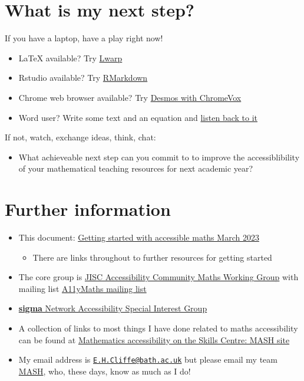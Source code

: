 \documentclass[
  17pt,
  a4paper]{extarticle}
\providecommand{\tightlist}{%
  \setlength{\itemsep}{0pt}\setlength{\parskip}{0pt}}
\theoremstyle{plain}
\theoremstyle{plain}
\theoremstyle{plain}
\theoremstyle{plain}
\theoremstyle{plain}
\theoremstyle{definition}
\theoremstyle{definition}
\theoremstyle{definition}
\theoremstyle{remark}
\renewcommand{\;}{\,}
\begin{document}
\hypertarget{what-is-my-next-step}{%
\section{What is my next step?}\label{what-is-my-next-step}}

If you have a laptop, have a play right now!

\begin{itemize}
\tightlist
\item
  LaTeX available? Try \href{LINK}{Lwarp}
\item
  Rstudio available? Try \href{https://stem-enable.github.io/RMarkdownWorkshop/}{RMarkdown}
\item
  Chrome web browser available? Try \href{https://people.bath.ac.uk/cspehj/coventry/arclengthInR.html}{Desmos with ChromeVox}
\item
  Word user? Write some text and an equation and \href{https://stem-enable.github.io/WordWorkshop/immersive.html}{listen back to it}
\end{itemize}

If not, watch, exchange ideas, think, chat:

\begin{itemize}
\tightlist
\item
  What achieveable next step can you commit to to improve the accessiblibility of your mathematical teaching resources for next academic year?
\end{itemize}

\hypertarget{further-information}{%
\section{Further information}\label{further-information}}

\begin{itemize}
\tightlist
\item
  This document: \href{}{Getting started with accessible maths March 2023}

  \begin{itemize}
  \tightlist
  \item
    There are links throughout to further resources for getting started
  \end{itemize}
\item
  The core group is \href{https://github.com/A11yMaths}{JISC Accessibility Community Maths Working Group} with mailing list \href{https://www.jiscmail.ac.uk/cgi-bin/webadmin?A0=ACCESSIBLE-MATHS}{A11yMaths mailing list}
\item
  \href{http://www.sigma-network.ac.uk/sigs/accessibility-sig/}{\textbf{sigma} Network Accessibility Special Interest Group}
\item
  A collection of links to most things I have done related to maths accessibility can be found at \href{https://www.bath.ac.uk/projects/mathematics-accessibility/}{Mathematics accessibility on the Skills Centre: MASH site}
\item
  My email address is \href{mailto:E.H.Cliffe@bath.ac.uk}{\nolinkurl{E.H.Cliffe@bath.ac.uk}} but please email my team \href{mailto:mash@bath.ac.uk}{MASH}, who, these days, know as much as I do!
\end{itemize}
\end{document}
